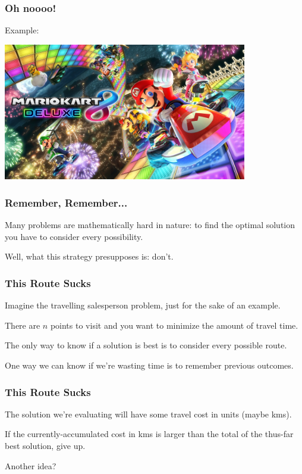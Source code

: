 \begin{frame}
\frametitle{Oh noooo!}

Example:
\begin{center}
	\includegraphics[width=0.8\textwidth]{images/mariokart.jpg}
\end{center}

\end{frame}



\begin{frame}
\frametitle{Remember, Remember...}

Many problems are mathematically hard in nature: to find the optimal solution you have to consider every possibility. 

Well, what this strategy presupposes is: don't.

\end{frame}


\begin{frame}
\frametitle{This Route Sucks}

Imagine the travelling salesperson problem, just for the sake of an example. 

There are $n$ points to visit and you want to minimize the amount of travel time. 

The only way to know if a solution is best is to consider every possible route.

One way we can know if we're wasting time is to remember previous outcomes.

\end{frame}


\begin{frame}
\frametitle{This Route Sucks}

The solution we're evaluating will have some travel cost in units (maybe kms). 

If the currently-accumulated cost in kms is larger than the total of the thus-far best solution, give up. 

Another idea?

\end{frame}

